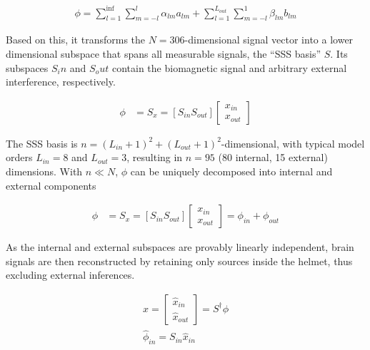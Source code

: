 \begin{equation}
	\begin{aligned}
	  \phi = \sum_{l=1}^{\inf}\sum_{m=-l}^{l} \alpha_{lm} a_{lm} + \sum_{l=1}^{L_{out}}\sum_{m=-l}^{1}\beta_{lm}b_{lm}
	\end{aligned}
\label{eq:sss}
\end{equation}

Based on this, it transforms the $N=306$-dimensional signal vector into a lower dimensional subspace that spans all measurable signals, the ``SSS basis'' $S$. Its subspaces $S_in$ and $S_out$ contain the biomagnetic signal and arbitrary external interference, respectively.

\begin{equation}
	\begin{aligned}
		    \phi &= S_x = [S_{in} S_{out}] \begin{bmatrix}
			x_{in} \\
			x_{out}
		\end{bmatrix}
	\end{aligned}
	\label{eq:sss}
\end{equation}

The SSS basis is $n=(L_{in}+1)^2+(L_{out}+1)^2$-dimensional, with typical model orders $L_{in}=8$ and $L_{out}=3$, resulting in $n=95$ (80 internal, 15 external) dimensions.
With $n \ll N$, $\phi$ can be uniquely decomposed into internal and external components

\begin{equation}
	\begin{aligned}
			\phi &= S_x = [S_{in} S_{out}] \begin{bmatrix}
			x_{in} \\
			x_{out}
		\end{bmatrix} = \phi_{in} + \phi_{out}
	\end{aligned}
	\label{eq:sss}
\end{equation}

As the internal and external subspaces are provably linearly independent, brain signals are then reconstructed by retaining only sources inside the helmet, thus excluding external inferences.


\begin{equation}
	\begin{aligned}
    \hat{x} =
\begin{bmatrix}
	\hat{x}_{in} \\
	\hat{x}_{out}
\end{bmatrix}
= S^{\dagger}\phi \\
\hat{\phi}_{in} = S_{in}\hat{x}_{in}\\
	\end{aligned}
	\label{eq:sss}
\end{equation}


